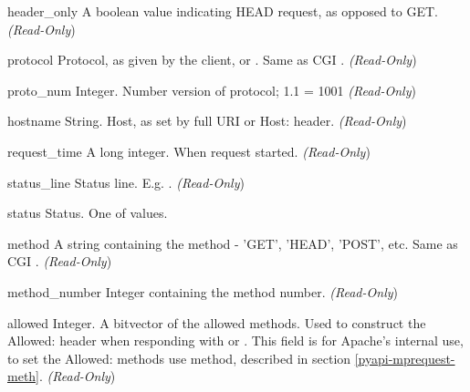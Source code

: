 \begin{memberdesc}[request]{header_only}
  A boolean value indicating HEAD request, as opposed to GET. 
  \emph{(Read-Only})
\end{memberdesc}

\begin{memberdesc}[request]{protocol}
  Protocol, as given by the client, or . Same as CGI .
  \emph{(Read-Only})
\end{memberdesc}

\begin{memberdesc}[request]{proto_num}
  Integer. Number version of protocol; 1.1 = 1001 
  \emph{(Read-Only})
\end{memberdesc}

\begin{memberdesc}[request]{hostname}
  String. Host, as set by full URI or Host: header.
  \emph{(Read-Only})
\end{memberdesc}

\begin{memberdesc}[request]{request_time}
  A long integer. When request started.
  \emph{(Read-Only})
\end{memberdesc}

\begin{memberdesc}[request]{status_line}
  Status line. E.g. . 
  \emph{(Read-Only})
\end{memberdesc}

\begin{memberdesc}[request]{status}
  Status. One of  values.
\end{memberdesc}

\begin{memberdesc}[request]{method}
  A string containing the method - 'GET', 'HEAD', 'POST', etc.
  Same as CGI .
  \emph{(Read-Only})
\end{memberdesc}

\begin{memberdesc}[request]{method_number}
  Integer containing the method number.
  \emph{(Read-Only})
\end{memberdesc}

\begin{memberdesc}[request]{allowed}
  Integer. A bitvector of the allowed methods. Used to construct the
  Allowed: header when responding with
   or
  . This field is for Apache's internal
  use, to set the Allowed: methods use 
  method, described in section \ref{pyapi-mprequest-meth}. 
  \emph{(Read-Only})
\end{memberdesc}

